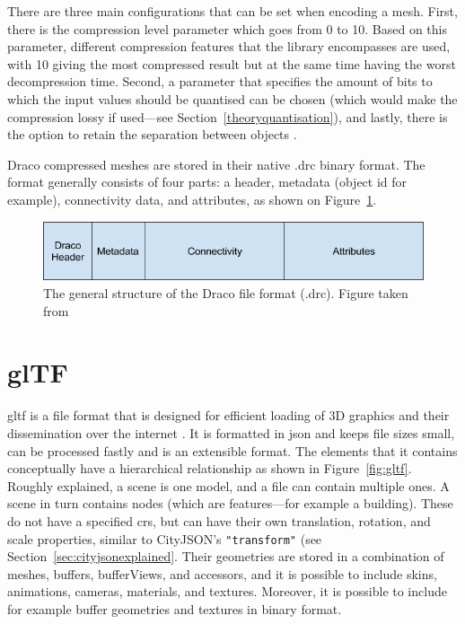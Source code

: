 There are three main configurations that can be set when encoding a mesh.
First, there is the compression level parameter which goes from 0 to 10.
Based on this parameter, different compression features that the library encompasses are used, with 10 giving the most compressed result but at the same time having the worst decompression time.
Second, a parameter that specifies the amount of bits to which the input values should be quantised can be chosen (which would make the compression lossy if used---see Section~\ref{theoryquantisation}), and lastly, there is the option to retain the separation between objects \cite{dracoperformance}.


Draco compressed meshes are stored in their native .drc binary format.
The format generally consists of four parts: a header, metadata (object id for example), connectivity data, and attributes, as shown on Figure~\ref{fig:draco_format}.


\begin{figure}[h!]
    \centering
    \includegraphics[scale=0.5]{figs/related_work/draco_format.png}
    \caption{The general structure of the Draco file format (.drc). Figure taken from \citet{dracospec}}
    \label{fig:draco_format}
\end{figure}



\section{glTF}
\label{sec:gltf}
\ac{gltf} is a file format that is designed for efficient loading of 3D graphics and their dissemination over the internet \citep{KhronosGroup2019}. 
It is formatted in \ac{json} and keeps file sizes small, can be processed fastly and is an extensible format.
The elements that it contains conceptually have a hierarchical relationship as shown in Figure~\ref{fig:gltf}.
Roughly explained, a scene is one model, and a file can contain multiple ones.
A scene in turn contains nodes (which are features---for example a building).
These do not have a specified \ac{crs}, but can have their own translation, rotation, and scale properties, similar to CityJSON's \texttt{"transform"} (see Section~\ref{sec:cityjsonexplained}.
Their geometries are stored in a combination of meshes, buffers, bufferViews, and accessors, and it is possible to include skins, animations, cameras, materials, and textures.
Moreover, it is possible to include for example buffer geometries and textures in binary format.

